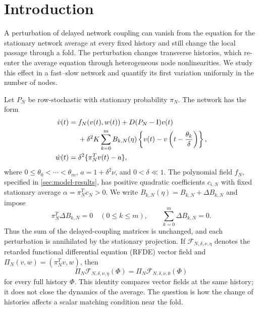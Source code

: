 \section{Introduction}
\label{sec:introduction}

A perturbation of delayed network coupling can vanish from the equation for
the stationary network average at every fixed history and still change the
local passage through a fold.  The perturbation changes transverse histories,
which re-enter the average equation through heterogeneous node nonlinearities.
We study this effect in a fast--slow network and quantify its first variation
uniformly in the number of nodes.

Let \(P_N\) be row-stochastic with stationary probability \(\pi_N\).
The network has the form
\begin{align}
 \dot v(t)={}&f_N(v(t),w(t))+D(P_N-\mathrm I)v(t)\notag\\
 &+\delta^2K\sum_{k=0}^m B_{k,N}(\eta)
   \left\{v(t)-v\left(t-\frac{\theta_k}{\delta}\right)\right\},
                                                        \label{eq:intro-network-form}\\
 \dot w(t)={}&\delta^2\{\pi_N^Tv(t)-a\},              \label{eq:intro-recovery-form}
\end{align}
where \(0\le\theta_0<\cdots<\theta_m\), \(a=1+\delta^2\nu\), and
\(0<\delta\ll1\).  The polynomial field \(f_N\), specified in
\cref{sec:model-results}, has positive quadratic coefficients \(c_{i,N}\)
with fixed stationary average \(\alpha=\pi_N^Tc_N>0\).
We write \(B_{k,N}(\eta)=B_{k,N}+\Delta B_{k,N}\) and impose
\begin{equation}
 \pi_N^T\Delta B_{k,N}=0\quad(0\le k\le m),
 \qquad \sum_{k=0}^m\Delta B_{k,N}=0.                \label{eq:intro-neutrality}
\end{equation}
Thus the sum of the delayed-coupling matrices is unchanged, and each
perturbation is annihilated by the stationary projection.  If
\(\mathcal F_{N,\delta,\nu,\eta}\) denotes the retarded functional
differential equation (RFDE) vector field and
\(\Pi_N(v,w)=(\pi_N^Tv,w)\), then
\begin{equation}
 \Pi_N\mathcal F_{N,\delta,\nu,\eta}(\Phi)
 =\Pi_N\mathcal F_{N,\delta,\nu,0}(\Phi)              \label{eq:intro-projected-identity}
\end{equation}
for every full history \(\Phi\).  This identity compares vector fields at the
same history; it does not close the dynamics of the average.  The question is
how the change of histories affects a scalar matching condition near the fold.

